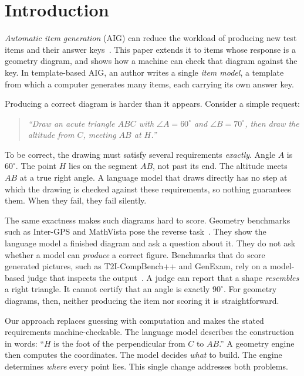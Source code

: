 \section{Introduction}
\label{sec:motivation}

\emph{Automatic item generation} (AIG) can reduce the workload of producing new test items and their answer keys~\citep{bejar2002generative,gierl2013aig}. This paper extends it to items whose response is a geometry diagram, and shows how a machine can check that diagram against the key. In template-based AIG, an author writes a single \emph{item model}, a template from which a computer generates many items, each carrying its own answer key.

Producing a correct diagram is harder than it appears. Consider a simple request:

\begin{quote}
\emph{``Draw an acute triangle $ABC$ with $\angle A = 60^\circ$ and $\angle B = 70^\circ$, then draw the altitude from $C$, meeting $AB$ at $H$.''}
\end{quote}

To be correct, the drawing must satisfy several requirements \emph{exactly}. Angle $A$ is $60^\circ$. The point $H$ lies on the segment $AB$, not past its end. The altitude meets $AB$ at a true right angle. A language model that draws directly has no step at which the drawing is checked against these requirements, so nothing guarantees them. When they fail, they fail silently.

The same exactness makes such diagrams hard to score. Geometry benchmarks such as Inter-GPS and MathVista pose the reverse task~\citep{lu2021intergps,lu2024mathvista}. They show the language model a finished diagram and ask a question about it. They do not ask whether a model can \emph{produce} a correct figure. Benchmarks that do score generated pictures, such as T2I-CompBench++ and GenExam, rely on a model-based judge that inspects the output~\citep{huang2025t2icompbenchpp,wang2025genexam}. A judge can report that a shape \emph{resembles} a right triangle. It cannot certify that an angle is exactly $90^\circ$. For geometry diagrams, then, neither producing the item nor scoring it is straightforward.

Our approach replaces guessing with computation and makes the stated requirements machine-checkable. The language model describes the construction in words: ``$H$ is the foot of the perpendicular from $C$ to $AB$.'' A geometry engine then computes the coordinates. The model decides \emph{what} to build. The engine determines \emph{where} every point lies. This single change addresses both problems.

